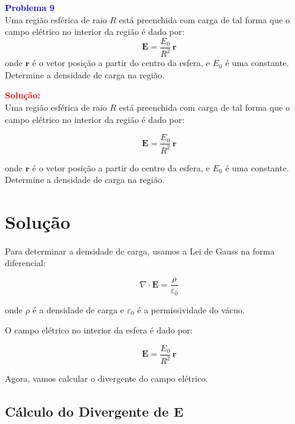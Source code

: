 \documentclass[a4paper,12pt]{article}
\begin{document}
\begin{flushleft}
\textbf{\textcolor{blue}{\Large Problema 9}}\\

Uma região esférica de raio \( R \) está preenchida com carga de tal forma que o campo elétrico no 
interior da região é dado por:
\begin{equation}
\mathbf{E} = \frac{E_0}{R^2} \, \mathbf{r}
\end{equation}
onde \( \mathbf{r} \) é o vetor posição a partir do centro da esfera, e \( E_0 \) é uma constante.\\

Determine a densidade de carga na região.

\textcolor{red}{\textbf{Solução:}}\\

Uma região esférica de raio \( R \) está preenchida com carga de tal forma que o campo elétrico no interior da região é dado por:

\begin{equation}
\mathbf{E} = \frac{E_0}{R^2} \, \mathbf{r}
\end{equation}

onde \( \mathbf{r} \) é o vetor posição a partir do centro da esfera, e \( E_0 \) é uma constante. Determine a densidade de carga na região.

\section*{Solução}

Para determinar a densidade de carga, usamos a Lei de Gauss na forma diferencial:

\begin{equation}
\nabla \cdot \mathbf{E} = \frac{\rho}{\varepsilon_0}
\end{equation}

onde \( \rho \) é a densidade de carga e \( \varepsilon_0 \) é a permissividade do vácuo.

O campo elétrico no interior da esfera é dado por:

\begin{equation}
\mathbf{E} = \frac{E_0}{R^2} \, \mathbf{r}
\end{equation}

Agora, vamos calcular o divergente do campo elétrico.

\subsection*{Cálculo do Divergente de \( \mathbf{E} \)}


\end{flushleft}
\end{document}
